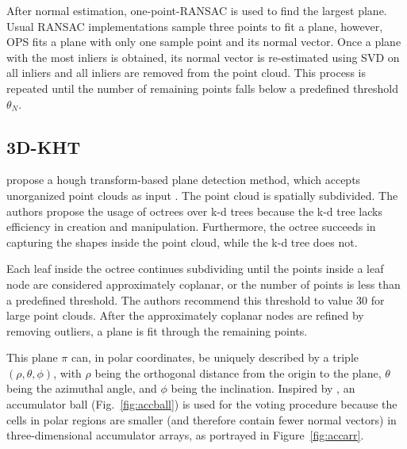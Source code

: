 \documentclass[main.tex]{subfiles}
\begin{document}
After normal estimation, one-point-RANSAC is used to find the largest plane. Usual RANSAC implementations sample three points to fit a plane, however, OPS fits a plane with only one sample point and its normal vector.
Once a plane with the most inliers is obtained, its normal vector is re-estimated using SVD on all inliers and all inliers are removed from the point cloud.
This process is repeated until the number of remaining points falls below a predefined threshold $\theta_N$.

\subsection{3D-KHT}\label{sub:3dkht}
\citeauthor{Limberger_Oliveira_2015} propose a hough transform-based plane detection method, which accepts unorganized point clouds as input \cite{Limberger_Oliveira_2015}.
The point cloud is spatially subdivided. The authors propose the usage of octrees over k-d trees because the k-d tree lacks efficiency in creation and manipulation.
Furthermore, the octree succeeds in capturing the shapes inside the point cloud, while the k-d tree does not.

Each leaf inside the octree continues subdividing until the points inside a leaf node are considered approximately coplanar, or the number of points is less than a predefined threshold.
The authors recommend this threshold to value 30 for large point clouds.
After the approximately coplanar nodes are refined by removing outliers, a plane is fit through the remaining points.

This plane $\pi$ can, in polar coordinates, be uniquely described by a triple $(\rho, \theta, \phi)$, with $\rho$ being the orthogonal distance from the origin to the plane, $\theta$ being the azimuthal angle, and $\phi$ being the inclination.
Inspired by \citeauthor{Borrmann_Elseberg_Lingemann_Nüchter_2011}\cite{Borrmann_Elseberg_Lingemann_Nüchter_2011}, an accumulator ball (Fig.~\ref{fig:accball}) is used for the voting procedure because the cells in polar regions are smaller (and therefore
contain fewer normal vectors) in three-dimensional accumulator arrays, as portrayed in Figure~\ref{fig:accarr}.
\end{document}
